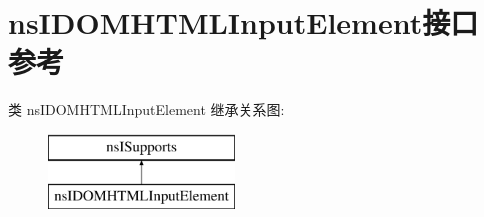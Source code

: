 \hypertarget{interfacens_i_d_o_m_h_t_m_l_input_element}{}\section{ns\+I\+D\+O\+M\+H\+T\+M\+L\+Input\+Element接口 参考}
\label{interfacens_i_d_o_m_h_t_m_l_input_element}
类 ns\+I\+D\+O\+M\+H\+T\+M\+L\+Input\+Element 继承关系图\+:\begin{figure}[H]
\begin{center}
\leavevmode
\includegraphics[height=2.000000cm]{interfacens_i_d_o_m_h_t_m_l_input_element}
\end{center}
\end{figure}
